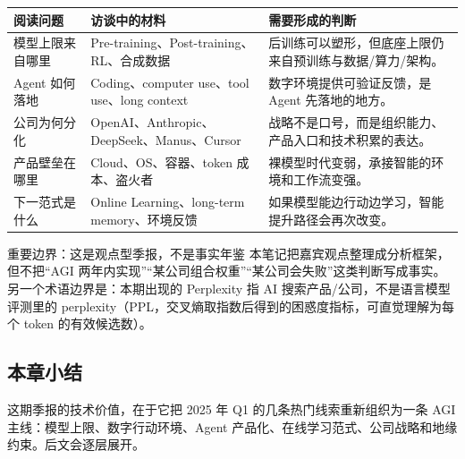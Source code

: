 \noindent\begin{tabularx}{\textwidth}{p{}p{}X}
\toprule
阅读问题 & 访谈中的材料 & 需要形成的判断 \\
\midrule
模型上限来自哪里 & Pre-training、Post-training、RL、合成数据 & 后训练可以塑形，但底座上限仍来自预训练与数据/算力/架构。 \\
Agent 如何落地 & Coding、computer use、tool use、long context & 数字环境提供可验证反馈，是 Agent 先落地的地方。 \\
公司为何分化 & OpenAI、Anthropic、DeepSeek、Manus、Cursor & 战略不是口号，而是组织能力、产品入口和技术积累的表达。 \\
产品壁垒在哪里 & Cloud、OS、容器、token 成本、盗火者 & 裸模型时代变弱，承接智能的环境和工作流变强。 \\
下一范式是什么 & Online Learning、long-term memory、环境反馈 & 如果模型能边行动边学习，智能提升路径会再次改变。 \\
\bottomrule
\end{tabularx}

\begin{warningbox}{重要边界：这是观点型季报，不是事实年鉴}
本笔记把嘉宾观点整理成分析框架，但不把“AGI 两年内实现”“某公司组合权重”“某公司会失败”这类判断写成事实。另一个术语边界是：本期出现的 Perplexity 指 AI 搜索产品/公司，不是语言模型评测里的 perplexity（PPL，交叉熵取指数后得到的困惑度指标，可直觉理解为每个 token 的有效候选数）。
\end{warningbox}

\subsection{本章小结}

这期季报的技术价值，在于它把 2025 年 Q1 的几条热门线索重新组织为一条 AGI 主线：模型上限、数字行动环境、Agent 产品化、在线学习范式、公司战略和地缘约束。后文会逐层展开。

